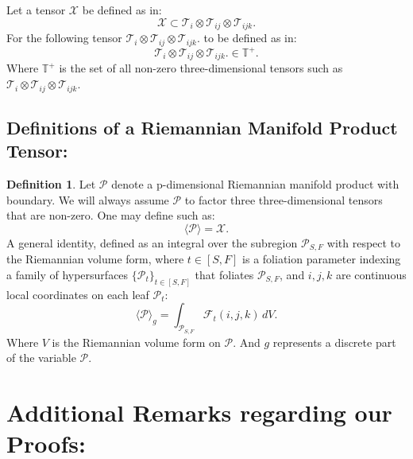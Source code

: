 \documentclass[10pt]{article}
\theoremstyle{plain}
\theoremstyle{definition}
\newtheorem{definition}[theorem]{Definition}
\theoremstyle{remark}
\begin{document}
Let a tensor $\mathcal{X}$ be defined as in:
\begin{equation}
  \mathcal{X} \subset \mathcal{T}_i \otimes \mathcal{T}_{ij} \otimes \mathcal{T}_{ijk}.
\end{equation}
For the following tensor $\mathcal{T}_i \otimes \mathcal{T}_{ij} \otimes \mathcal{T}_{ijk}.$ to be defined as in:
\begin{equation}
  \mathcal{T}_i \otimes \mathcal{T}_{ij} \otimes \mathcal{T}_{ijk}. \in \mathbb{T}^{+}.
\end{equation}
Where $\mathbb{T}^{+}$ is the set of all non-zero three-dimensional tensors such as $\mathcal{T}_i \otimes \mathcal{T}_{ij} \otimes \mathcal{T}_{ijk}.$

\subsection{Definitions of a Riemannian Manifold Product Tensor:}

\begin{definition}
\label{def:two-one}
    Let $\mathcal{P}$ denote a p-dimensional Riemannian manifold product with boundary. We will always assume $\mathcal{P}$ to factor three three-dimensional tensors that are non-zero. One may define such as:
    \begin{equation}
      \langle \mathcal{P} \rangle = \mathcal{X}.
    \end{equation}
    A general identity, defined as an integral over the subregion $\mathcal{P}_{S,F}$ with respect to the Riemannian volume form, where $t \in [S, F]$ is a foliation parameter indexing a family of hypersurfaces $\{\mathcal{P}_t\}_{t \in [S,F]}$ that foliates $\mathcal{P}_{S,F}$, and $i, j, k$ are continuous local coordinates on each leaf $\mathcal{P}_t$:
    \begin{equation}
      \langle \mathcal{P} \rangle_{g} = \int_{\mathcal{P}_{S,F}} \mathcal{F}_{t}(i, j, k) \, dV.
    \end{equation}
    Where $V$ is the Riemannian volume form on $\mathcal{P}$. And $g$ represents a discrete part of the variable $\mathcal{P}$. 
\end{definition}

\section{Additional Remarks regarding our Proofs:}
\end{document}
